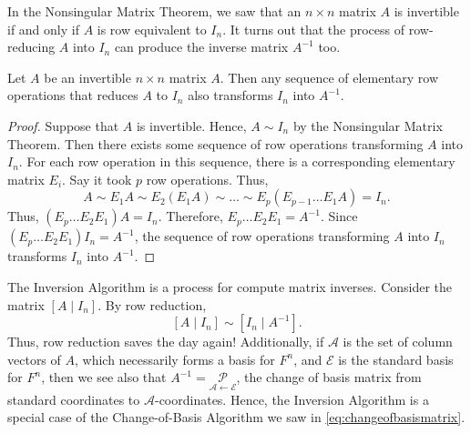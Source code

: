 In the Nonsingular Matrix Theorem, we saw that an $n\times n$ matrix $A$ is invertible if and only if $A$ is row equivalent to $I_n$. It turns out that the process of row-reducing $A$ into $I_n$ can produce the inverse matrix $A^{-1}$ too.\\

\begin{Thm}\label{thm:inversealgor} Let $A$ be an invertible $n\times n$ matrix $A$. Then any sequence of elementary row operations that reduces $A$ to $I_n$ also transforms $I_n$ into $A^{-1}$.
\end{Thm}
\begin{proof}
Suppose that $A$ is invertible. Hence, $A\sim I_n$ by the Nonsingular Matrix Theorem. Then there exists some sequence of row operations transforming $A$ into $I_n$. For each row operation in this sequence, there is a corresponding elementary matrix $E_i$. Say it took $p$ row operations. Thus, 
\[A\sim E_1A \sim E_2(E_1A) \sim \ldots \sim E_p(E_{p-1}\ldots E_1A) = I_n.\] Thus, $(E_p\ldots E_2E_1)A = I_n$. Therefore, $E_p\ldots E_2E_1 = A^{-1}$.  Since $(E_p\ldots E_2E_1)I_n = A^{-1}$, the sequence of row operations transforming $A$ into $I_n$ transforms $I_n$ into $A^{-1}$.
\end{proof}\vs

The Inversion Algorithm is a process for compute matrix inverses. Consider the matrix $[A \mid I_n]$. By row reduction, \begin{equation}\label{eq:inversionalgorithm} [A \mid I_n] \sim [I_n \mid A^{-1}].\end{equation} Thus, row reduction saves the day again! Additionally, if $\mathcal{A}$ is the set of column vectors of $A$, which necessarily forms a basis for $F^n$, and $\mathcal{E}$ is the standard basis for $F^n$, then we see also that $A^{-1} = \underset{\mathcal{A}\leftarrow \mathcal{E}}{\mathcal P}$, the change of basis matrix from standard coordinates to $\mathcal{A}$-coordinates. Hence, the Inversion Algorithm is a special case of the Change-of-Basis Algorithm we saw in \eqref{eq:changeofbasismatrix}.\\


